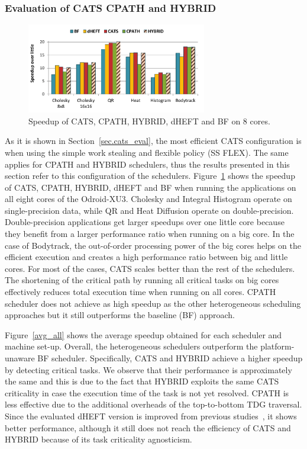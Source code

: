 \subsubsection{Evaluation of CATS CPATH and HYBRID}
\begin{figure}[!t]
	\centering
	\includegraphics[width=0.7\textwidth]{figures/8cores.pdf}
	\caption{Speedup of CATS, CPATH, HYBRID, dHEFT and BF on 8 cores.}
	\label{BFLinear}
	\vspace{-0.4cm}
\end{figure}
As it is shown in Section~\ref{sec.cats_eval}, the most efficient CATS configuration is when using the simple work stealing and flexible policy (SS FLEX).
The same applies for CPATH and HYBRID schedulers, thus the results presented in this section refer to this configuration of the schedulers. 
Figure~\ref{BFLinear} shows the speedup of CATS, CPATH, HYBRID, dHEFT and BF when running the applications on all eight cores of the Odroid-XU3. Cholesky and Integral Histogram operate on single-precision data, while QR and Heat Diffusion operate on double-precision. 
Double-precision applications get larger speedups over one little core because they benefit from a larger performance ratio when running on a big core. In the case of Bodytrack, the out-of-order processing power of the big cores helps on the efficient execution and creates a high performance ratio between big and little cores. 
For most of the cases, CATS scales better than the rest of the schedulers. 
The shortening of the critical path by running all critical tasks on big cores effectively reduces total execution time when running on all cores. 
CPATH scheduler does not achieve as high speedup as the other heterogeneous scheduling approaches but it still outperforms the baseline (BF) approach.

Figure~\ref{avg_all} shows the average speedup obtained for each scheduler and machine set-up. 
Overall, the heterogeneous schedulers outperform the platform-unaware BF scheduler.
Specifically, CATS and HYBRID achieve a higher speedup by detecting critical tasks.
We observe that their performance is approximately the same and this is due to the fact that HYBRID exploits the same CATS criticality in case the execution time of the task is not yet resolved.
CPATH is less effective due to the additional overheads of the top-to-bottom TDG traversal.
Since the evaluated dHEFT version is improved from previous studies~\cite{Chronaki:ICS2015}, it shows better performance, although it still does not reach the efficiency of CATS and HYBRID because of its task criticality agnosticism.

